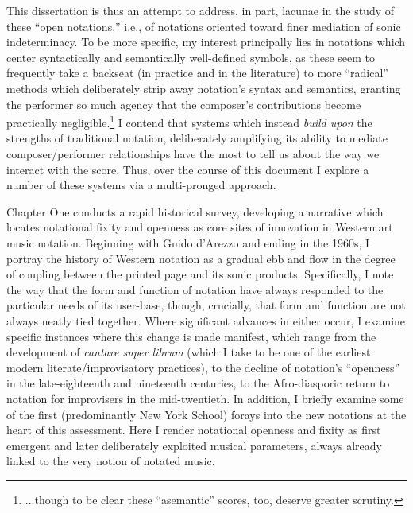 This dissertation is thus an attempt to address, in part, lacunae in the study of these ``open notations,'' i.e., of notations oriented toward finer mediation of sonic indeterminacy.
To be more specific, my interest principally lies in notations which center syntactically and semantically well-defined symbols, as these seem to frequently take a backseat (in practice and in the literature) to more ``radical'' methods which deliberately strip away notation's syntax and semantics, granting the performer so much agency that the composer's contributions become practically negligible.\footnote{...though to be clear these ``asemantic'' scores, too, deserve greater scrutiny.}
I contend that systems which instead \textit{build upon} the strengths of traditional notation, deliberately amplifying its ability to mediate composer/performer relationships have the most to tell us about the way we interact with the score.
Thus, over the course of this document I explore a number of these systems via a multi-pronged approach.

Chapter One conducts a rapid historical survey, developing a narrative which locates notational fixity and openness as core sites of innovation in Western art music notation. 
Beginning with Guido d'Arezzo and ending in the 1960s, I portray the history of Western notation as a gradual ebb and flow in the degree of coupling between the printed page and its sonic products. 
Specifically, I note the way that the form and function of notation have always responded to the particular needs of its user-base, though, crucially, that form and function are not always neatly tied together.
Where significant advances in either occur, I examine specific instances where this change is made manifest, which range from the development of \textit{cantare super librum} (which I take to be one of the earliest modern literate/improvisatory practices), to the decline of notation's ``openness'' in the late-eighteenth and nineteenth centuries, to the Afro-diasporic return to notation for improvisers in the mid-twentieth.
In addition, I briefly examine some of the first (predominantly New York School) forays into the new notations at the heart of this assessment. 
Here I render notational openness and fixity as first emergent and later deliberately exploited musical parameters, always already linked to the very notion of notated music.

